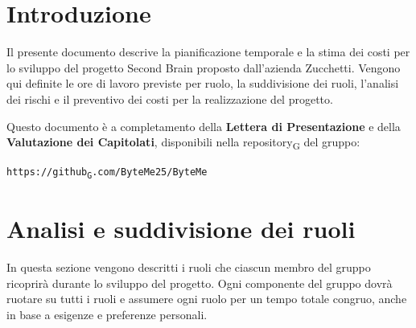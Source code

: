 \documentclass[11pt,a4paper]{article}
\newcommand{\gls}[1]{#1\textsubscript{G}}
\begin{document}
\newpage

\tableofcontents
\thispagestyle{empty}
\newpage

\setcounter{page}{1}

\section{Introduzione}
Il presente documento descrive la pianificazione temporale e la stima dei costi per lo sviluppo del progetto Second Brain proposto dall'azienda Zucchetti. Vengono qui definite le ore di lavoro previste per ruolo, la suddivisione dei ruoli, l'analisi dei rischi e il preventivo dei costi per la realizzazione del progetto.

Questo documento è a completamento della \textbf{Lettera di Presentazione} e della \textbf{Valutazione dei Capitolati}, disponibili nella \gls{repository} del gruppo:

\begin{center}
\texttt{https://\gls{github}.com/ByteMe25/ByteMe}
\end{center}

\vspace{1cm}

\section{Analisi e suddivisione dei ruoli}
In questa sezione vengono descritti i ruoli che ciascun membro del gruppo ricoprirà durante lo sviluppo del progetto. Ogni componente del gruppo dovrà ruotare su tutti i ruoli e assumere ogni ruolo per un tempo totale congruo, anche in base a esigenze e preferenze personali.
\end{document}
